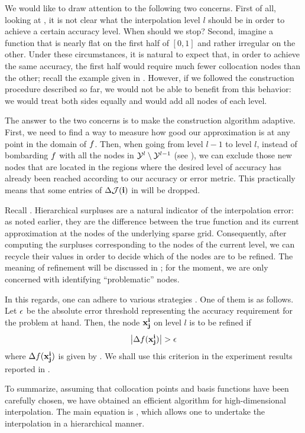 We would like to draw attention to the following two concerns. First of all,
looking at , it is not clear what the interpolation
level $l$ should be in order to achieve a certain accuracy level. When should we
stop? Second, imagine a function that is nearly flat on the first half of $[0,
1]$ and rather irregular on the other. Under these circumstances, it is natural
to expect that, in order to achieve the same accuracy, the first half would
require much fewer collocation nodes than the other; recall the example given in
. However, if we followed the construction procedure described
so far, we would not be able to benefit from this behavior: we would treat both
sides equally and would add all nodes of each level.

The answer to the two concerns is to make the construction algorithm adaptive.
First, we need to find a way to measure how good our approximation is at any
point in the domain of $f$. Then, when going from level $l - 1$ to level $l$,
instead of bombarding $f$ with all the nodes in $\mathcal{Y}^l \setminus \mathcal{Y}^{l - 1}$
(see ), we can exclude those new nodes that are
located in the regions where the desired level of accuracy has already been
reached according to our accuracy or error metric. This practically means that
some entries of $\Delta\mathcal{J}(\mathbf{i})$ in  will be
dropped.

Recall . Hierarchical surpluses are a natural indicator of the
interpolation error: as noted earlier, they are the difference between the true
function and its current approximation at the nodes of the underlying sparse
grid. Consequently, after computing the surpluses corresponding to the nodes of
the current level, we can recycle their values in order to decide which of the
nodes are to be refined. The meaning of refinement will be discussed in
; for the moment, we are only concerned with identifying
``problematic'' nodes.

In this regards, one can adhere to various strategies \cite{ma2009}. One of them
is as follows. Let $\epsilon$ be the absolute error threshold representing the
accuracy requirement for the problem at hand. Then, the node $\mathbf{x}^{\mathbf{i}}_{\mathbf{j}}$ on
level $l$ is to be refined if
\begin{equation} \elab{error}
  \left| \surplus(\vx^\vi_\vj) \right| > \error
\end{equation}
where $\Delta f(\mathbf{x}^{\mathbf{i}}_{\mathbf{j}})$ is given by . We shall use this
criterion in the experiment results reported in .

To summarize, assuming that collocation points and basis functions have been
carefully chosen, we have obtained an efficient algorithm for high-dimensional
interpolation. The main equation is , which allows
one to undertake the interpolation in a hierarchical manner.
